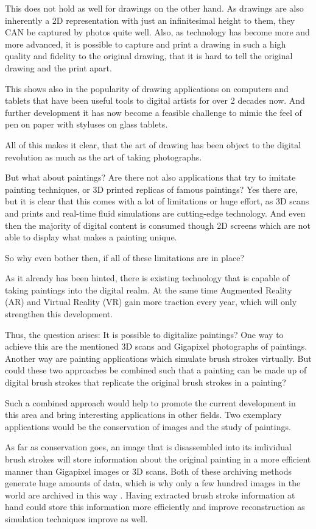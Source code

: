 This does not hold as well for drawings on the other hand.
As drawings are also inherently a 2D representation with just an infinitesimal height
to them, they CAN be captured by photos quite well.
Also, as technology has become more and more advanced, it is possible to capture
and print a drawing in such a high quality and fidelity to the original drawing, that
it is hard to tell the original drawing and the print apart.

This shows also in the popularity of drawing applications on computers and tablets
that have been useful tools to digital artists for over 2 decades now.
And further development it has now become a feasible challenge to mimic the feel
of pen on paper with styluses on glass tablets.

All of this makes it clear, that the art of drawing has been object to the digital revolution
as much as the art of taking photographs.

But what about paintings?
Are there not also applications that try to imitate painting techniques, or 3D printed
replicas of famous paintings?
Yes there are, but it is clear that this comes with a lot of limitations or huge effort,
as 3D scans and prints and real-time fluid simulations are cutting-edge technology.
And even then the majority of digital content is consumed though 2D screens which
are not able to display what makes a painting unique.

So why even bother then, if all of these limitations are in place?

As it already has been hinted, there is existing technology that is capable of taking
paintings into the digital realm.
At the same time Augmented Reality (AR) and Virtual Reality (VR) gain more traction
every year, which will only strengthen this development.

Thus, the question arises: It is possible to digitalize paintings?
One way to achieve this are the mentioned 3D scans and Gigapixel photographs of paintings.
Another way are painting applications which simulate brush strokes virtually.
But could these two approaches be combined such that a painting can be made up
of digital brush strokes that replicate the original brush strokes in a painting?

Such a combined approach would help to promote the current development in this area
and bring interesting applications in other fields.
Two exemplary applications would be the conservation of images and the study of paintings.

As far as conservation goes, an image that is disassembled into its individual brush
strokes will store information about the original painting in a more efficient manner
than Gigapixel images or 3D scans.
Both of these archiving methods generate huge amounts of data, which is why only a few
hundred images in the world are archived in this way \cite{googleartproject}.
Having extracted brush stroke information at hand could store this information
more efficiently and improve reconstruction as simulation techniques improve as well.

